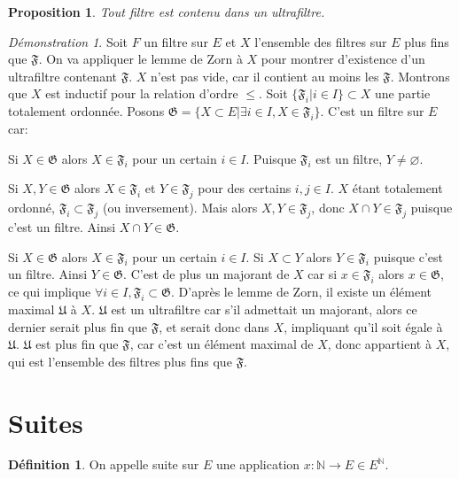 \documentclass[a4paper, 11pt, french]{book}
\newenvironment{itemise}{\itemize}{\enditemize}
\theoremstyle{plain} %
\newtheorem{proposition}{Proposition}
\theoremstyle{definition} %
\newtheorem{definition}{Définition}
\theoremstyle{remark} %
\newtheorem*{demonstration}{Démonstration}
\newcommand{\1}{\mathds{1}}
\newcommand\vide{\varnothing}
\newcommand{\infegal}{\leqslant}
\newcommand{\N}{\mathbb{N}}
\begin{document}
\begin{proposition}
	Tout filtre est contenu dans un ultrafiltre.
\end{proposition}

\begin{demonstration}
	Soit $F$ un filtre sur $E$ et $X$ l'ensemble des filtres sur $E$ plus fins que $\mathfrak{F}$.
	On va appliquer le lemme de Zorn à $X$ pour montrer d'existence d'un ultrafiltre contenant $\mathfrak{F}$.
	$X$ n'est pas vide, car il contient au moins les $\mathfrak{F}$.
	Montrons que $X$ est inductif pour la relation d'ordre $\infegal$.
	Soit $\{\mathfrak{F}_i | i\in I\}\subset X$ une partie totalement ordonnée.
	Posons $\mathfrak{G}=\{X\subset E | \exists i\in I, X\in\mathfrak{F}_i\}$.
	C'est un filtre sur $E$ car:
	\begin{itemise}
		\item Si $X\in\mathfrak{G}$ alors $X\in\mathfrak{F}_i$ pour un certain $i\in I$.
		Puisque $\mathfrak{F}_i$ est un filtre, $Y\neq\vide$.
		\item Si $X, Y\in\mathfrak{G}$ alors $X\in\mathfrak{F}_i$ et $Y\in\mathfrak{F}_j$ pour des certains $i, j\in I$.
		$X$ étant totalement ordonné, $\mathfrak{F}_i\subset\mathfrak{F}_j$ (ou inversement).
		Mais alors $X, Y\in\mathfrak{F}_j$, donc $X\cap Y\in\mathfrak{F}_j$ puisque c'est un filtre.
		Ainsi $X\cap Y\in\mathfrak{G}$.
		\item Si $X\in\mathfrak{G}$ alors $X\in\mathfrak{F}_i$ pour un certain $i\in I$.
		Si $X\subset Y$ alors $Y\in\mathfrak{F}_i$ puisque c'est un filtre.
		Ainsi $Y\in\mathfrak{G}$.
	\end{itemise}
	C'est de plus un majorant de $X$ car si $x\in\mathfrak{F}_i$ alors $x\in\mathfrak{G}$, ce qui implique $\forall i\in I, \mathfrak{F}_i\subset\mathfrak{G}$.
	D'après le lemme de Zorn, il existe un élément maximal $\mathfrak{U}$ à $X$.
	$\mathfrak{U}$ est un ultrafiltre car s'il admettait un majorant, alors ce dernier serait plus fin que $\mathfrak{F}$, et serait donc dans $X$, impliquant qu'il soit égale à $\mathfrak{U}$.
	$\mathfrak{U}$ est plus fin que $\mathfrak{F}$, car c'est un élément maximal de $X$, donc appartient à $X$, qui est l'ensemble des filtres plus fins que $\mathfrak{F}$.
\end{demonstration}

\section{Suites}

\begin{definition}
	On appelle suite sur $E$ une application $x:\N\rightarrow E\in E^\N$.
\end{definition}
\end{document}

